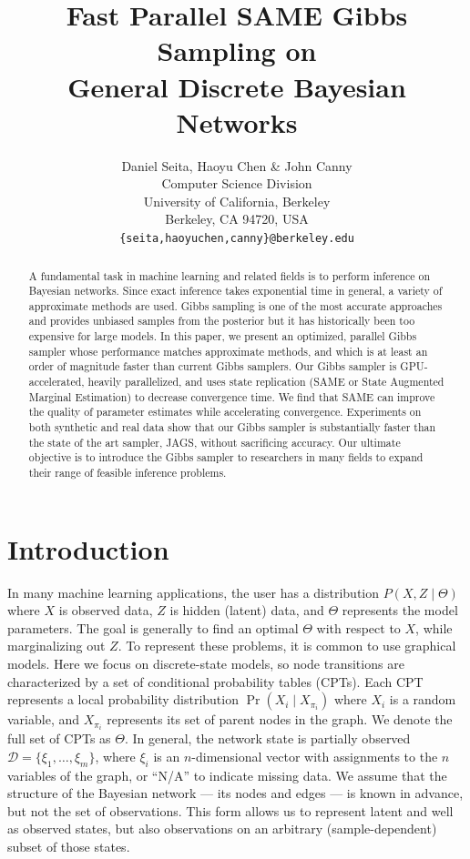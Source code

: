 \documentclass{article} %
\title{Fast Parallel SAME Gibbs Sampling on \\ General Discrete Bayesian Networks}
\author{Daniel Seita, Haoyu Chen \& John Canny \\
Computer Science Division \\
University of California, Berkeley \\
Berkeley, CA 94720, USA \\
\texttt{\{seita,haoyuchen,canny\}@berkeley.edu}
}
\begin{document}
\maketitle

\begin{abstract}
A fundamental task in machine learning and related fields is to
perform inference on Bayesian networks. Since exact inference takes
exponential time in general, a variety of approximate methods are
used.  Gibbs sampling is one of the most accurate approaches and
provides unbiased samples from the posterior but it has historically
been too expensive for large models. In this paper, we present an
optimized, parallel Gibbs sampler whose performance matches
approximate methods, and which is at least an order of magnitude faster
than current Gibbs samplers.  Our Gibbs sampler is GPU-accelerated,
heavily parallelized, and uses state replication (SAME or State
Augmented Marginal Estimation) to decrease convergence time. We find
that SAME can improve the quality of parameter estimates while accelerating
convergence.  Experiments on both synthetic and real data
show that our Gibbs sampler is substantially faster than the state of
the art sampler, JAGS, without sacrificing accuracy. Our ultimate
objective is to introduce the Gibbs sampler to researchers in many
fields to expand their range of feasible inference problems.
\end{abstract}




\section{Introduction}\label{sec:intro}

In many machine learning applications, the user has a distribution
$P(X,Z \mid \Theta)$ where $X$ is observed data, $Z$ is hidden
(latent) data, and $\Theta$ represents the model parameters. The goal
is generally to find an optimal $\Theta$ with respect to $X$, while
marginalizing out $Z$. To represent these problems, it is common to
use graphical models.  Here we focus on discrete-state models,
so node transitions are characterized by a set of conditional
probability tables (CPTs). Each CPT represents a local probability
distribution $\Pr(X_i \mid X_{\pi_i})$ where $X_i$ is a random
variable, and $X_{\pi_i}$ represents its set of parent nodes in the
graph. We denote the full set of CPTs as $\Theta$.  In general, the
network state is partially observed $\mathcal{D} = \{\xi_1, \ldots,
\xi_m\}$, where $\xi_i$ is an $n$-dimensional vector with assignments
to the $n$ variables of the graph, or ``N/A'' to indicate missing
data. We assume that the structure of the Bayesian network --- its
nodes and edges --- is known in advance, but not the set of
observations. This form allows us to represent latent and well as
observed states, but also observations on an arbitrary
(sample-dependent) subset of those states.
\end{document}
